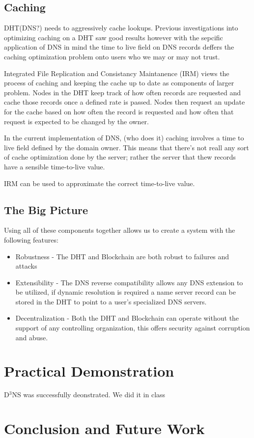 \documentclass[11pt]{IEEEtran} %
\begin{document}
\subsection{Caching}
DHT(DNS?) needs to aggressively cache lookups. Previous investigations into optimizing caching on a DHT saw good results \cite{irm} however with the sepcific application of DNS in mind the time to live field on DNS records deffers the caching optimization problem onto users who we may or may not trust.

Integrated File Replication and Consistancy Maintanence (IRM) \cite{irm} views the process of caching and keeping the cache up to date as components of larger problem.  Nodes in the DHT keep track of how often records are requested and cache those records once a defined rate is passed.  Nodes then request an update for the cache based on how often the record is requested and how often that request is expected to be changed by the owner.


In the current implementation of DNS, (who does it) caching involves a time to live field defined by the domain owner. This means that there's not reall any sort of cache optimization done by the server; rather the server that thew records have a sensible time-to-live value.



IRM \cite{irm}  can be used to approximate the correct time-to-live value.


\subsection{The Big Picture}
Using all of these components together allows us to create a system with the following features:
\begin{itemize}
	\item Robustness - The DHT and Blockchain are both robust to failures and attacks
	\item Extensibility - The DNS reverse compatibility allows any DNS extension to be utilized, if dynamic resolution is required a name server record can be stored in the DHT to point to a user's specialized DNS servers.
	\item Decentralization - Both the DHT and Blockchain can operate without the support of any controlling organization, this offers security against corruption and abuse.
\end{itemize}	


\section{Practical Demonstration}
D$^3$NS was successfully  deonstrated.  We did it in class



\section{Conclusion and Future Work}


\end{document}
